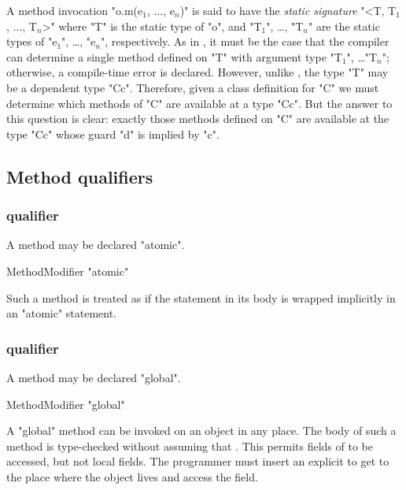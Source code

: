 A method invocation \xcdmath"o.m(e$_1$, $\dots$, e$_n$)"
is said to have the {\em static signature}
\xcdmath"<T, T$_1$, $\dots$, T$_n$>" where \xcd"T" is the static type of
\xcd"o", and
\xcdmath"T$_1$",
\dots,
\xcdmath"T$_n$"
are the static types of \xcdmath"e$_1$", \dots, \xcdmath"e$_n$",
respectively.  As in
\Java, it must be the case that the compiler can determine a single
method defined on \xcd"T" with argument type
\xcdmath"T$_1$", \dots \xcdmath"T$_n$"; otherwise, a
compile-time error is declared. However, unlike \Java, the \Xten{} type \xcd"T"
may be a dependent type \xcd"C{c}". Therefore, given a class definition for
\xcd"C" we must determine which methods of \xcd"C" are available at a type
\xcd"C{c}". But the answer to this question is clear: exactly those methods
defined on \xcd"C" are available at the type \xcd"C{c}"
whose guard \xcd"d" is implied by \xcd"c".

\subsection{Method qualifiers}
\label{MethodQualifier}

\subsubsection{ qualifier}
\label{AtomicAnnotation}

A method may be declared \xcd"atomic".

\begin{grammar}
  MethodModifier \: \xcd"atomic"  
\end{grammar}

Such a method is treated as if the statement in its body is wrapped 
implicitly in an \xcd"atomic" statement.

\subsubsection{ qualifier}
\label{LocalAnnotation}
\label{GlobalMethod}

A method may be declared \xcd"global".

\begin{grammar}
  MethodModifier \: \xcd"global"  
\end{grammar}

A \xcd"global" method can be invoked on an object  in any place. The
body of such a method is type-checked without assuming that
. This permits  fields of  to
be accessed, but not local fields. The programmer must insert an explicit
 to get to the place where the object lives and access
the field.

